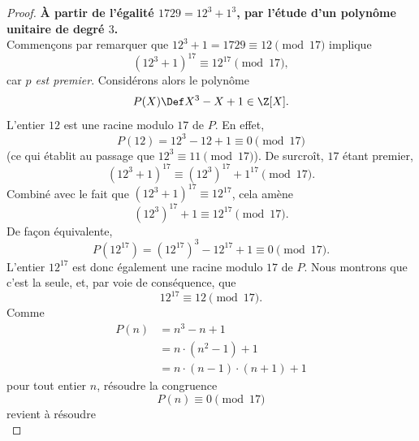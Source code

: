 \begin{proof}%
\textbf{À partir de l'égalité $1729 = 12^3 + 1^3$, par l'étude d'un polynôme unitaire de degré $3$.} 
\\
Commençons par remarquer que %
$12^3 + 1= 1729\equiv 12\pmod{17}$ implique 
%
\begin{equation}
  (12^3 + 1)^{17} \equiv 12^{17} \pmod{17}, 
\end{equation}
%
car \emph{$p$ est premier}.
Considérons alors le polynôme %
%
\begin{equation}
  P(X) \Def X^3 -X + 1 \in \Z[X].
\end{equation}
%
L'entier $12$ est une racine modulo $17$ de $P$. En effet, 
%
\begin{equation}
  P(12) = 12^3 - 12 + 1  \equiv 0 \pmod{17} 
\end{equation}
%
(ce qui établit au passage que $12^3 \equiv 11 \pmod{17}$). De surcroît, $17$ étant premier, 
%
\begin{equation}
  (12^3 + 1 )^{17} \equiv (12^3)^{17} + 1^{17} \pmod{17}.
\end{equation}
%
Combiné avec le fait que $(12^3 + 1)^{17} \equiv 12^{17}$, cela amène 
%
\begin{equation}
  (12^3)^{17} + 1  \equiv 12^{17} \pmod{17}.
\end{equation}
%
De façon équivalente, 
%
\begin{equation}
  P(12^{17}) = (12^{17})^3 - 12^{17} + 1 \equiv 0 \pmod{17}.
\end{equation}
%
L'entier $12^{17}$ est donc également une racine modulo $17$ de $P$. Nous montrons que c'est la seule, et, par voie de %
conséquence, que 
%
\begin{equation}
  12^{17} \equiv 12 \pmod{17}. 
\end{equation}
%
Comme 
%
\begin{align}
  P(n) &= n^3 - n  + 1 \\
  &= n \cdot (n^2 - 1) + 1 \\
  &= n \cdot (n-1) \cdot (n+1) +1  
\end{align}
%
pour tout entier $n$, résoudre la congruence 
%
\begin{equation}
  P(n) \equiv 0 \pmod{17} 
\end{equation}
%
revient à résoudre 
%
\begin{equation}

\end{equation}
\end{proof}
